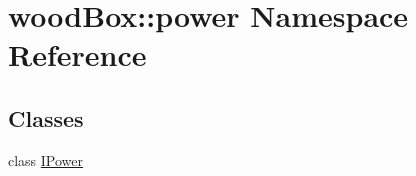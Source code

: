 \hypertarget{namespacewood_box_1_1power}{}\section{wood\+Box\+:\+:power Namespace Reference}
\label{namespacewood_box_1_1power}
\subsection*{Classes}
\begin{DoxyCompactItemize}
\item 
class \mbox{\hyperlink{classwood_box_1_1power_1_1_i_power}{I\+Power}}
\end{DoxyCompactItemize}
